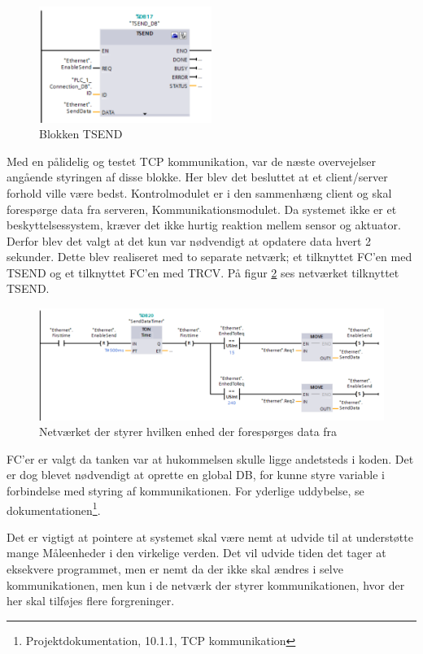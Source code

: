 \begin{figure}[H] %
	\centering
	\includegraphics[width=0.5\textwidth]{Figure/TSEND}
	\caption{Blokken TSEND}
	\label{fig:TSEND}
\end{figure}


Med en pålidelig og testet TCP kommunikation, var de næste overvejelser angående styringen af disse blokke. Her blev det besluttet at et client/server forhold ville være bedst. Kontrolmodulet er i den sammenhæng client og skal forespørge data fra serveren, Kommunikationsmodulet.
Da systemet ikke er et beskyttelsessystem, kræver det ikke hurtig reaktion mellem sensor og aktuator. Derfor blev det valgt at det kun var nødvendigt at opdatere data hvert 2 sekunder. Dette blev realiseret med to separate netværk; et tilknyttet FC'en med TSEND og et tilknyttet FC'en med TRCV. På figur \ref{fig:ValgAfEnhedSend} ses netværket tilknyttet TSEND.

\begin{figure}[H] %
	\centering
	\includegraphics[width=1\textwidth]{Figure/valgAfEnhedSend}
	\caption{Netværket der styrer hvilken enhed der forespørges data fra}
	\label{fig:ValgAfEnhedSend}
\end{figure}

FC'er er valgt da tanken var at hukommelsen skulle ligge andetsteds i koden. Det er dog blevet nødvendigt at oprette en global DB, for kunne styre variable i forbindelse med styring af kommunikationen. For yderlige uddybelse, se dokumentationen\footnote{Projektdokumentation, 10.1.1, TCP kommunikation}.


Det er vigtigt at pointere at systemet skal være nemt at udvide til at understøtte mange Måleenheder i den virkelige verden. Det vil udvide tiden det tager at eksekvere programmet, men er nemt da der ikke skal ændres i selve kommunikationen, men kun i de netværk der styrer kommunikationen, hvor der her skal tilføjes flere forgreninger.

